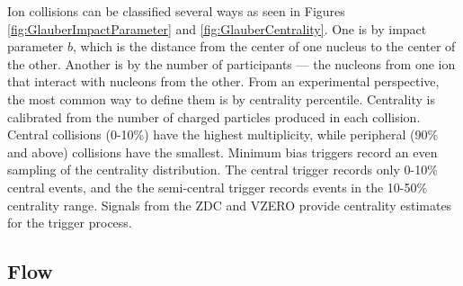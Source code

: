 Ion collisions can be classified several ways \cite{Abelev:2013xaa} as seen in Figures \ref{fig:GlauberImpactParameter} and \ref{fig:GlauberCentrality}.
One is by impact parameter $b$, which is the distance from the center of one nucleus to the center of the other.
Another is by the number of participants --- the nucleons from one ion that interact with nucleons from the other.
From an experimental perspective, the most common way to define them is by centrality percentile.
Centrality is calibrated from the number of charged particles produced in each collision.
Central collisions (0-10\%) have the highest multiplicity, while peripheral (90\% and above) collisions have the smallest.
Minimum bias triggers record an even sampling of the centrality distribution.
The central trigger records only 0-10\% central events, and the the semi-central trigger records events in the 10-50\% centrality range.
Signals from the ZDC and VZERO provide centrality estimates for the trigger process.





\subsection{Flow}
\label{sec:Flow}

